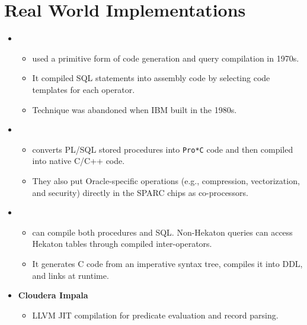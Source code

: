 \documentclass[11pt]{article}
\begin{document}
\section{Real World Implementations}
\begin{itemize}
    \item {}~\cite{chamberlin1981}
    \begin{itemize}
        \item
         used a primitive form of code generation and query compilation in 1970s.
        
        \item
        It compiled SQL statements into assembly code by selecting code templates for each 
        operator.
        
        \item
        Technique was abandoned when IBM built  in the 1980s.
    \end{itemize}
    
    \item {}
    \begin{itemize}
        \item
         converts PL/SQL stored procedures into \texttt{Pro*C} code and then compiled 
        into native C/C++ code.
        
        \item
        They also put Oracle-specific operations (e.g., compression, vectorization, and security) 
        directly in the SPARC chips as co-processors.
    \end{itemize}
    
    \item {}~\cite{freedman2014}
    \begin{itemize}
        \item
         can compile both procedures and SQL. Non-Hekaton queries can 
        access Hekaton tables through compiled inter-operators.
        
        \item
        It generates C code from an imperative syntax tree, compiles it into DDL, and links at 
        runtime.
    \end{itemize}
    
    \item \textbf{Cloudera Impala}~\cite{kornacker2015}
    \begin{itemize}
        \item
        LLVM JIT compilation for predicate evaluation and record parsing.
        

\end{itemize}
\end{itemize}
\end{document}
